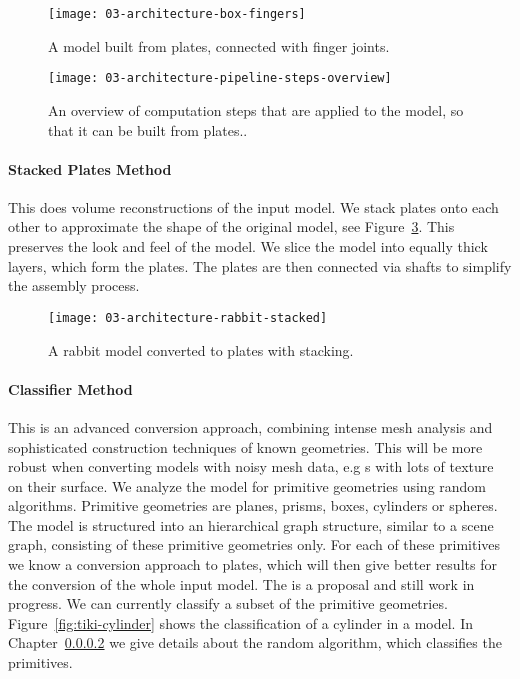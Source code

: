 \documentclass[../ClassicThesis.tex]{subfiles}
\begin{document}
\begin{figure}[h]
  \centering
  \texttt{[image: 03-architecture-box-fingers]}
  \caption{A model built from plates, connected with finger
    joints.}
  \label{fig:model-fingers}
\end{figure}

\begin{figure}[h]
  \centering
  \texttt{[image: 03-architecture-pipeline-steps-overview]}
  \caption{An overview of computation steps that are applied
    to the model, so that it can be built from plates..}
  \label{fig:overview-plate-steps}
\end{figure}



\paragraph{Stacked Plates Method}

This \class{\fabmethod} does volume reconstructions of the
input model. We stack plates onto each other to approximate
the shape of the original model, see
Figure~\ref{fig:stacked-rabbit}. This preserves the look and
feel of the model. We slice the model into equally thick
layers, which form the plates. The plates are then connected
via shafts to simplify the assembly process.

\begin{figure}[h]
  \centering
  \texttt{[image: 03-architecture-rabbit-stacked]}
  \caption{A rabbit model converted to plates with
    stacking.}
  \label{fig:stacked-rabbit}
\end{figure}

\paragraph{Classifier Method}

This is an advanced conversion approach, combining intense
mesh analysis and sophisticated construction techniques of
known geometries. This \class{\fabmethod} will be more
robust when converting models with noisy mesh data, e.g
{\threedmodel}s with lots of texture on their surface. We
analyze the model for primitive geometries using random
algorithms. Primitive geometries are planes, prisms, boxes,
cylinders or spheres. The model is structured into an
hierarchical graph structure, similar to a scene graph,
consisting of these primitive geometries only. For each of
these primitives we know a conversion approach to plates,
which will then give better results for the conversion of
the whole input model. The  is a
proposal and still work in progress. We can currently
classify a subset of the primitive geometries.
Figure~\ref{fig:tiki-cylinder} shows the classification of a
cylinder in a model. In Chapter~\ref{}  we give details about the random algorithm,
which classifies the primitives.
\end{document}
